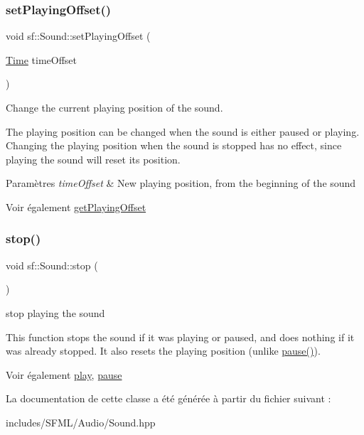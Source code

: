 \subsubsection{\texorpdfstring{set\+Playing\+Offset()}{setPlayingOffset()}}
{\footnotesize\ttfamily void sf\+::\+Sound\+::set\+Playing\+Offset (\begin{DoxyParamCaption}\item[{\hyperlink{classsf_1_1Time}{Time}}]{time\+Offset }\end{DoxyParamCaption})}



Change the current playing position of the sound. 

The playing position can be changed when the sound is either paused or playing. Changing the playing position when the sound is stopped has no effect, since playing the sound will reset its position.


\begin{DoxyParams}{Paramètres}
{\em time\+Offset} & New playing position, from the beginning of the sound\\
\hline
\end{DoxyParams}
\begin{DoxySeeAlso}{Voir également}
\hyperlink{classsf_1_1Sound_a559bc3aea581107bcb380fdbe523aa08}{get\+Playing\+Offset} 
\end{DoxySeeAlso}
\mbox{\label{classsf_1_1Sound_aa9c91c34f7c6d344d5ee9b997511f754}} 
\subsubsection{\texorpdfstring{stop()}{stop()}}
{\footnotesize\ttfamily void sf\+::\+Sound\+::stop (\begin{DoxyParamCaption}{ }\end{DoxyParamCaption})}



stop playing the sound 

This function stops the sound if it was playing or paused, and does nothing if it was already stopped. It also resets the playing position (unlike \hyperlink{classsf_1_1Sound_a5eeb25815bfa8cdc4a6cc000b7b19ad5}{pause()}).

\begin{DoxySeeAlso}{Voir également}
\hyperlink{classsf_1_1Sound_a2953ffe632536e72e696fd880ced2532}{play}, \hyperlink{classsf_1_1Sound_a5eeb25815bfa8cdc4a6cc000b7b19ad5}{pause} 
\end{DoxySeeAlso}


La documentation de cette classe a été générée à partir du fichier suivant \+:\begin{DoxyCompactItemize}
\item 
includes/\+S\+F\+M\+L/\+Audio/Sound.\+hpp\end{DoxyCompactItemize}
